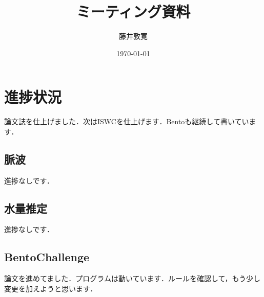 \documentclass[a4j,10pt]{jarticle}
\title{ミーティング資料}
\author{藤井敦寛}
\date{\today}
\begin{document}
\maketitle

\section{進捗状況}
論文誌を仕上げました．次はISWCを仕上げます．Bentoも継続して書いています．

\subsection{脈波}
進捗なしです．

\subsection{水量推定}
進捗なしです．

\subsection{BentoChallenge}
論文を進めてました．プログラムは動いています．ルールを確認して，もう少し変更を加えようと思います．





\end{document}
